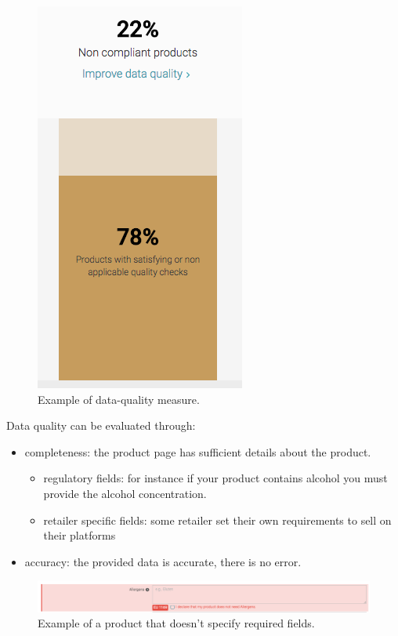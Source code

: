 \begin{figure}[H]
\centering
\includegraphics[scale=0.50]{./images/data-quality/data-quality-2.png}
\caption{Example of data-quality measure.}
\end{figure}

Data quality can be evaluated through:
\begin{itemize}
\item completeness: the product page has sufficient details about the product.
	\begin{itemize}
		\item regulatory fields: for instance if your product contains alcohol you must provide the alcohol concentration.
		\item retailer specific fields: some retailer set their own requirements to sell on their platforms
	\end{itemize}
\item accuracy: the provided data is accurate, there is no error.
\end{itemize}

\begin{figure}[H]
\centering
\includegraphics[scale=0.4]{./images/data-quality/data-quality.png}
\caption{Example of a product that doesn't specify required fields.}
\end{figure}

